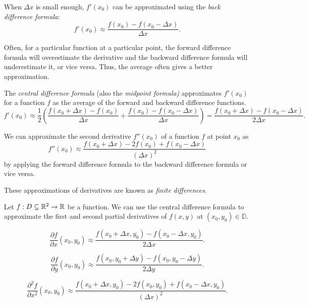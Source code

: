 \begin{defn}
    When $\Delta x$ is small enough, $f'(x_0)$ can be approximated using the \emph{back difference formula}: \[f'(x_0) \approx \frac{f(x_0) - f(x_0 - \Delta x)}{\Delta x}.\]
\end{defn}

\begin{rmk}
    Often, for a particular function at a particular point, the forward difference formula will overestimate the derivative and the backward difference formula will underestimate it, or vice versa. Thus, the average often gives a better approximation.
\end{rmk}

\begin{defn}
    The \emph{central difference formula} (also the \emph{midpoint formula)} approximates $f'(x_0)$ for a function $f$ as the average of the forward and backward difference functions. \[f'(x_0) \approx \frac{1}{2}\left(\frac{f(x_0 + \Delta x) - f(x_0)}{\Delta x} + \frac{f(x_0) - f(x_0 - \Delta x)}{\Delta x}\right) = \frac{f(x_0 + \Delta x) - f(x_0 - \Delta x)}{2\Delta x}.\]
\end{defn}

\begin{rmk}
    We can approximate the second derivative $f''(x_0)$ of a function $f$ at point $x_0$ as \[f''(x_0) \approx \frac{f(x_0 + \Delta x) - 2f(x_0) + f(x_0 - \Delta x)}{\left(\Delta x\right)^2}\] by applying the forward difference formula to the backward difference formula or vice versa.
\end{rmk}

\begin{defn}
    These approximations of derivatives are known as \emph{finite differences}.
\end{defn}

\begin{exmp}
    Let $f: D \subseteq \mathbb{R}^2 \to \mathbb{R}$ be a function. We can use the central difference formula to approximate the first and second partial derivatives of $f(x, y)$ at $(x_0, y_0) \in \mathbb{D}$.

    \[\frac{\partial f}{\partial x}(x_0, y_0) \approx \frac{f(x_0 + \Delta x, y_0) - f(x_0 - \Delta x, y_0)}{2\Delta x}.\]

    \[\frac{\partial f}{\partial y}(x_0, y_0) \approx \frac{f(x_0, y_0  + \Delta y) - f(x_0, y_0 - \Delta y)}{2\Delta y}.\]

    \[\frac{\partial^2 f}{\partial x^2}(x_0, y_0) \approx \frac{f(x_0 + \Delta x, y_0) - 2f(x_0, y_0) + f(x_0 - \Delta x, y_0)}{\left(\Delta x\right)^2}.\]
\end{exmp}

